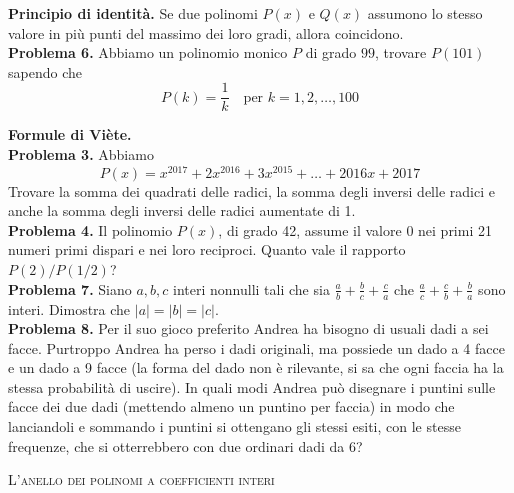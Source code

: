\documentclass[a4paper]{article}
\theoremstyle{remark}
\theoremstyle{definition}
\begin{document}
\begin{multicols}{2}
	\textbf{Principio di identità.} Se due polinomi $ P(x) $ e $ Q(x) $ assumono lo stesso valore in più punti del massimo dei loro gradi, allora coincidono. \\
	
	\textbf{Problema 6.} Abbiamo un polinomio monico $ P $ di grado $ 99 $, trovare $ P(101) $ sapendo che
	\[ P(k) = \frac{1}{k} \quad \text{per } k = 1, 2, \dots, 100 \]
	
	\textbf{Formule di Viète.} \\
	
	\textbf{Problema 3.} Abbiamo
	\[ P(x) = x^{2017} + 2x^{2016} +3x^{2015} + \dots + 2016x + 2017 \]
	Trovare la somma dei quadrati delle radici, la somma degli inversi delle radici e anche la somma degli inversi delle radici aumentate di 1. \\
	
	\textbf{Problema 4.} Il polinomio $ P(x) $, di grado 42, assume il valore 0 nei primi 21 numeri primi dispari e nei loro reciproci. Quanto vale il rapporto $ P(2)/P(1/2) $?\\
	
	
	
	\textbf{Problema 7.} Siano $ a, b, c $ interi nonnulli tali che sia $ \frac{a}{b} +\frac{b}{c}+ \frac{c}{a} $ che $ \frac{a}{c} +\frac{c}{b}+ \frac{b}{a} $ sono interi. Dimostra che $ |a| = |b| = |c| $. \\
	
	\textbf{Problema 8.} Per il suo gioco preferito Andrea ha bisogno di usuali dadi a sei facce. Purtroppo Andrea ha perso i dadi originali, ma possiede un dado a 4 facce e un dado a 9 facce (la forma del dado non è rilevante, si sa che ogni faccia ha la stessa probabilità di uscire). In quali modi Andrea può disegnare i puntini sulle facce dei due dadi (mettendo almeno un puntino per faccia) in modo che lanciandoli e sommando i puntini si ottengano gli stessi esiti, con le stesse frequenze, che si otterrebbero con due ordinari dadi da 6?
	
\end{multicols}

\begin{center}
	\textsc{L'anello dei polinomi a coefficienti interi}
\end{center}
\end{document}
